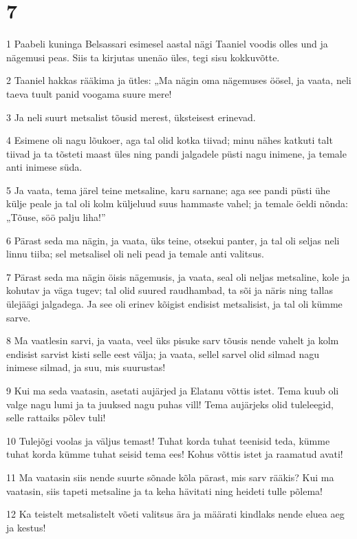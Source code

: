 \chapter{7}

\par 1 Paabeli kuninga Belsassari esimesel aastal nägi Taaniel voodis olles und ja nägemusi peas. Siis ta kirjutas unenäo üles, tegi sisu kokkuvõtte.
\par 2 Taaniel hakkas rääkima ja ütles: „Ma nägin oma nägemuses öösel, ja vaata, neli taeva tuult panid voogama suure mere!
\par 3 Ja neli suurt metsalist tõusid merest, üksteisest erinevad.
\par 4 Esimene oli nagu lõukoer, aga tal olid kotka tiivad; minu nähes katkuti talt tiivad ja ta tõsteti maast üles ning pandi jalgadele püsti nagu inimene, ja temale anti inimese süda.
\par 5 Ja vaata, tema järel teine metsaline, karu sarnane; aga see pandi püsti ühe külje peale ja tal oli kolm küljeluud suus hammaste vahel; ja temale öeldi nõnda: „Tõuse, söö palju liha!”
\par 6 Pärast seda ma nägin, ja vaata, üks teine, otsekui panter, ja tal oli seljas neli linnu tiiba; sel metsalisel oli neli pead ja temale anti valitsus.
\par 7 Pärast seda ma nägin öisis nägemusis, ja vaata, seal oli neljas metsaline, kole ja kohutav ja väga tugev; tal olid suured raudhambad, ta sõi ja näris ning tallas ülejäägi jalgadega. Ja see oli erinev kõigist endisist metsalisist, ja tal oli kümme sarve.
\par 8 Ma vaatlesin sarvi, ja vaata, veel üks pisuke sarv tõusis nende vahelt ja kolm endisist sarvist kisti selle eest välja; ja vaata, sellel sarvel olid silmad nagu inimese silmad, ja suu, mis suurustas!
\par 9 Kui ma seda vaatasin, asetati aujärjed ja Elatanu võttis istet. Tema kuub oli valge nagu lumi ja ta juuksed nagu puhas vill! Tema aujärjeks olid tuleleegid, selle rattaiks põlev tuli!
\par 10 Tulejõgi voolas ja väljus temast! Tuhat korda tuhat teenisid teda, kümme tuhat korda kümme tuhat seisid tema ees! Kohus võttis istet ja raamatud avati!
\par 11 Ma vaatasin siis nende suurte sõnade kõla pärast, mis sarv rääkis? Kui ma vaatasin, siis tapeti metsaline ja ta keha hävitati ning heideti tulle põlema!
\par 12 Ka teistelt metsalistelt võeti valitsus ära ja määrati kindlaks nende eluea aeg ja kestus!
